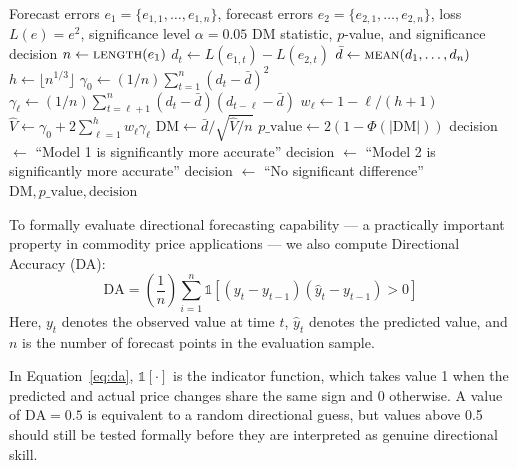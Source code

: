 \documentclass[pdflatex,sn-mathphys-num]{sn-jnl}%
\theoremstyle{thmstyleone}%
\theoremstyle{thmstyletwo}%
\theoremstyle{thmstylethree}%
\begin{document}
\begin{algorithm}[H]
\caption{Pairwise Diebold--Mariano Predictive Accuracy Test}
\label{alg:dm_test}
\begin{algorithmic}[1]
\Require Forecast errors $e_1=\{e_{1,1},\ldots,e_{1,n}\}$, forecast errors $e_2=\{e_{2,1},\ldots,e_{2,n}\}$, loss $L(e)=e^2$, significance level $\alpha=0.05$
\Ensure DM statistic, $p$-value, and significance decision
\State $n \gets \textsc{length}(e_1)$
    \State $d_t \gets L(e_{1,t}) - L(e_{2,t})$ 
\EndFor
\State $\bar{d} \gets \textsc{mean}(d_1,\ldots,d_n)$
\State $h \gets \lfloor n^{1/3} \rfloor$
\State $\gamma_0 \gets (1/n) \sum_{t=1}^{n} (d_t - \bar{d})^2$
    \State $\gamma_{\ell} \gets (1/n) \sum_{t=\ell+1}^{n} (d_t - \bar{d})(d_{t-\ell} - \bar{d})$
    \State $w_{\ell} \gets 1 - \ell/(h+1)$
\EndFor
\State $\hat{V} \gets \gamma_0 + 2 \sum_{\ell=1}^{h} w_{\ell}\gamma_{\ell}$
\State $\mathrm{DM} \gets \bar{d} / \sqrt{\hat{V}/n}$
\State $p\_\text{value} \gets 2(1 - \Phi(|\mathrm{DM}|))$
        \State decision $\gets$ ``Model 1 is significantly more accurate''
    \Else
        \State decision $\gets$ ``Model 2 is significantly more accurate''
    \EndIf
\Else
    \State decision $\gets$ ``No significant difference''
\EndIf
\State \Return $\mathrm{DM}, p\_\text{value}, \text{decision}$
\end{algorithmic}
\end{algorithm}

To formally evaluate directional forecasting capability --- a practically important property in commodity price applications --- we also compute Directional Accuracy (DA):
\begin{equation}
\mathrm{DA} = \left(\frac{1}{n}\right) \sum_{i=1}^{n} \mathbb{1}\left[(y_t - y_{t-1})(\hat{y}_t - y_{t-1}) > 0\right]
\label{eq:da}
\end{equation}
Here, $y_t$ denotes the observed value at time $t$, $\hat{y}_t$ denotes the predicted value, and $n$ is the number of forecast points in the evaluation sample.

In Equation~\ref{eq:da}, $\mathbb{1}[\cdot]$ is the indicator function, which takes value 1 when the predicted and actual price changes share the same sign and 0 otherwise. A value of $\mathrm{DA}=0.5$ is equivalent to a random directional guess, but values above 0.5 should still be tested formally before they are interpreted as genuine directional skill.
\end{document}
